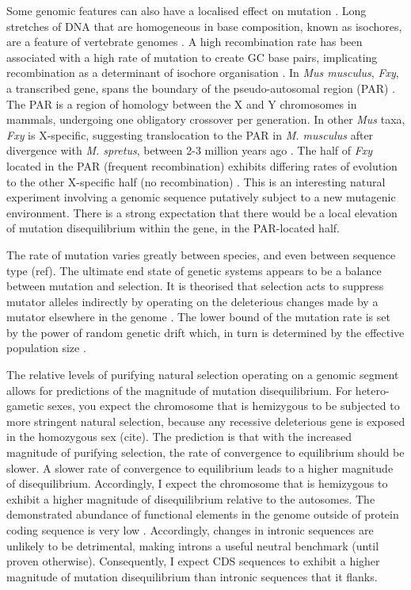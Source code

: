 Some genomic features can also have a localised effect on mutation \citep{Lynch2016GeneticRate}. Long stretches of DNA that are homogeneous in base composition, known as isochores, are a feature of vertebrate genomes \citep{Bernardi1989TheGenome, Bernardi2000IsochoresVertebrates}. A high recombination rate has been associated with a high rate of mutation to create GC base pairs, implicating recombination as a determinant of isochore organisation \citep{Montoya-Burgos2003RecombinationGenomes}. In \textit{Mus musculus}, \textit{Fxy}, a transcribed gene, spans the boundary of the pseudo-autosomal region (PAR) \citep{Palmer1997AMice}. The PAR is a region of homology between the X and Y chromosomes in mammals, undergoing one obligatory crossover per generation.  In other \textit{Mus} taxa, \textit{Fxy} is X-specific, suggesting translocation to the PAR in \textit{M. musculus} after divergence with \textit{M. spretus}, between 2-3 million years ago \citep{Huang2005HowMammals}. The half of \textit{Fxy} located in the PAR (frequent recombination) exhibits differing rates of evolution to the other X-specific half (no recombination) \citep{Perry1999EvolutionaryPosition}. This is an interesting natural experiment involving a genomic sequence putatively subject to a new mutagenic environment. There is a strong expectation that there would be a local elevation of mutation disequilibrium within the gene, in the PAR-located half. 

The rate of mutation varies greatly between species, and even between sequence type (ref). The ultimate end state of genetic systems appears to be a balance between mutation and selection. It is theorised that selection acts to suppress mutator alleles indirectly by operating on the deleterious changes made by a mutator elsewhere in the genome \citep{Lynch2010EvolutionRate}. The lower bound of the mutation rate is set by the power of random genetic drift which, in turn is determined by the effective population size \citep{Lynch2010EvolutionRate}. 

The relative levels of purifying natural selection operating on a genomic segment allows for predictions of the magnitude of mutation disequilibrium. For hetero-gametic sexes, you expect the chromosome that is hemizygous to be subjected to more stringent natural selection, because any recessive deleterious gene is exposed in the homozygous sex (cite). The prediction is that with the increased magnitude of purifying selection, the rate of convergence to equilibrium should be slower. A slower rate of convergence to equilibrium leads to a higher magnitude of disequilibrium. Accordingly, I expect the chromosome that is hemizygous to exhibit a higher magnitude of disequilibrium relative to the autosomes. The demonstrated abundance of functional elements in the genome outside of protein coding sequence is very low \citep{Graur2013OnENCODE}. Accordingly, changes in intronic sequences are unlikely to be detrimental, making introns a useful neutral benchmark (until proven otherwise). Consequently, I expect CDS sequences to exhibit a higher magnitude of mutation disequilibrium than intronic sequences that it flanks. 

